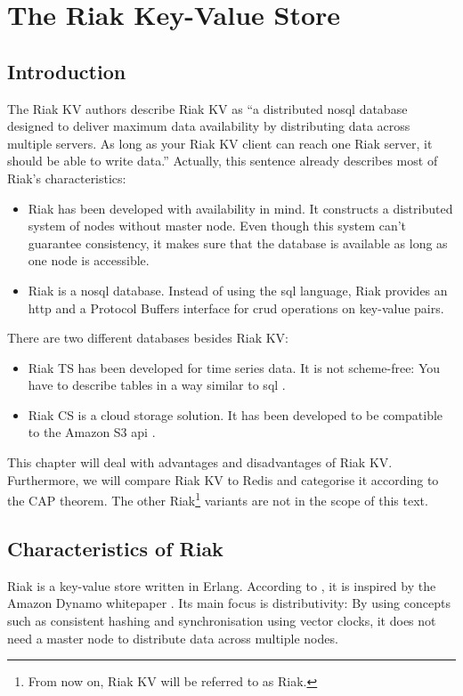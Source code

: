 \section{The Riak Key-Value Store}

\subsection{Introduction}
The Riak KV authors describe Riak KV as \enquote{a distributed \gls{nosql} database designed to deliver maximum data availability by distributing data across multiple servers. As long as your Riak KV client can reach one Riak server, it should be able to write data.} \parencite{RiakKV} Actually, this sentence already describes most of Riak's characteristics:
\begin{itemize}
	\item Riak has been developed with availability in mind. It constructs a distributed system of nodes without master node. Even though this system can't guarantee consistency, it makes sure that the database is available as long as one node is accessible.
	\item Riak is a \gls{nosql} database. Instead of using the \gls{sql} language, Riak provides an \gls{http} \parencite{RiakKVHTTP} and a Protocol Buffers \parencite{RiakKVProtoBuf} interface for \gls{crud} operations on key-value pairs.
\end{itemize}

There are two different databases besides Riak KV:
\begin{itemize}
	\item Riak TS has been developed for time series data. It is not scheme-free: You have to describe tables in a way similar to \gls{sql} \parencite{RiakTS}.
	\item Riak CS is a cloud storage solution. It has been developed to be compatible to the Amazon S3 \gls{api} \parencite{RiakCS}.
\end{itemize}

This chapter will deal with advantages and disadvantages of Riak KV. Furthermore, we will compare Riak KV to Redis and categorise it according to the CAP theorem. The other Riak\footnote{From now on, Riak KV will be referred to as Riak.} variants are not in the scope of this text.

\subsection{Characteristics of Riak}
Riak is a key-value store written in Erlang. According to \textcite{Kuznetsov2014}, it is inspired by the Amazon Dynamo whitepaper \parencite{DeCandia2007Dynamo}. Its main focus is distributivity: By using concepts such as consistent hashing and synchronisation using vector clocks, it does not need a master node to distribute data across multiple nodes.

